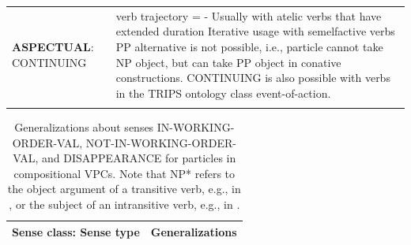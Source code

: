 \documentclass[output=paper
,modfonts
,nonflat]{langsci/langscibook}
\begin{document}
\begin{table}[ht]
\begin{tabular}{p{1in}p{3.5in}}
  \textbf{ASPECTUAL}: \newline CONTINUING
   & verb trajectory = - \newline Usually with atelic verbs that have extended duration \newline Iterative usage with semelfactive verbs \newline PP alternative is not possible, i.e., particle cannot take NP object, but can take PP object in conative constructions. \newline CONTINUING is also possible with verbs in the TRIPS ontology class event-of-action.\\ 
  \lspbottomrule
 \end{tabular}%
\end{table}

\begin{table}[ht]%
\caption{Generalizations about senses IN-WORKING-ORDER-VAL, NOT-IN-WORKING-ORDER-VAL, and DISAPPEARANCE for particles in compositional VPCs. Note that NP* refers to the object argument of a transitive verb, e.g.,  in , or the subject of an intransitive verb, e.g.,  in .}
\label{tab:1:findings-prtcls-3senses}
\small
 \begin{tabular}{p{1.3in}p{3.2in}}
  \lsptoprule
   \textbf{Sense class}: \newline Sense type
        & Generalizations\\
    \midrule


\end{tabular}
\end{table}
\end{document}
